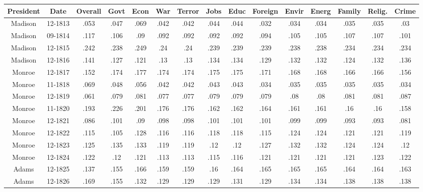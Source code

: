 \begin{sidewaystable}
\begin{singlespace}
\begin{center}
 \begin{tabular}{||c c c c c c c c c c c c c c c||}
 \hline
 President & Date & Overall & Govt & Econ & War & Terror & Jobs & Educ & Foreign & Envir & Energ & Family & Relig. & Crime \\
 \hline\hline
Madison & 12-1813 & .053 & .047 & .069 & .042 & .042 & .044 & .044 & .032 & .034 & .034 & .035 & .035 & .03 \\ 
\hline
Madison & 09-1814 & .117 & .106 & .09 & .092 & .092 & .092 & .092 & .094 & .105 & .105 & .107 & .107 & .101 \\ 
\hline
Madison & 12-1815 & .242 & .238 & .249 & .24 & .24 & .239 & .239 & .239 & .238 & .238 & .234 & .234 & .234 \\ 
\hline
Madison & 12-1816 & .141 & .127 & .121 & .13 & .13 & .134 & .134 & .129 & .132 & .132 & .124 & .132 & .136 \\ 
\hline
Monroe & 12-1817 & .152 & .174 & .177 & .174 & .174 & .175 & .175 & .171 & .168 & .168 & .166 & .166 & .156 \\ 
\hline
Monroe & 11-1818 & .069 & .048 & .056 & .042 & .042 & .043 & .043 & .034 & .035 & .035 & .035 & .035 & .034 \\ 
\hline
Monroe & 12-1819 & .061 & .079 & .081 & .077 & .077 & .079 & .079 & .079 & .08 & .08 & .081 & .081 & .087 \\ 
\hline
Monroe & 11-1820 & .193 & .226 & .201 & .176 & .176 & .162 & .162 & .164 & .161 & .161 & .16 & .16 & .158 \\ 
\hline
Monroe & 12-1821 & .086 & .101 & .09 & .098 & .098 & .101 & .101 & .101 & .099 & .099 & .093 & .093 & .081 \\ 
\hline
Monroe & 12-1822 & .115 & .105 & .128 & .116 & .116 & .118 & .118 & .115 & .124 & .124 & .121 & .121 & .119 \\ 
\hline
Monroe & 12-1823 & .125 & .135 & .133 & .119 & .119 & .12 & .12 & .127 & .132 & .132 & .124 & .124 & .12 \\ 
\hline
Monroe & 12-1824 & .122 & .12 & .121 & .113 & .113 & .115 & .116 & .121 & .121 & .121 & .121 & .123 & .122 \\ 
\hline
Adams & 12-1825 & .137 & .155 & .166 & .159 & .159 & .16 & .164 & .165 & .165 & .165 & .164 & .164 & .163 \\ 
\hline
Adams & 12-1826 & .169 & .155 & .132 & .129 & .129 & .129 & .131 & .129 & .134 & .134 & .138 & .138 & .138 \\ 

\end{tabular}
\end{center}
\end{singlespace}
\end{sidewaystable}
